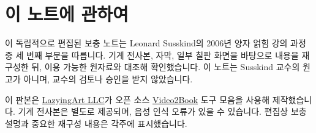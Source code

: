 \documentclass[11pt,oneside]{book}
\begin{document}
\frontmatter
\hypersetup{pageanchor=false}

\hypersetup{pageanchor=true}

\clearpage
\chapter{이 노트에 관하여}
이 독립적으로 편집된 보충 노트는 Leonard Susskind의 2006년 양자 얽힘 강의 과정 중 세 번째 부분을 따릅니다. 기계 전사본, 자막, 일부 칠판 화면을 바탕으로 내용을 재구성한 뒤, 이용 가능한 원자료와 대조해 확인했습니다. 이 노트는 Susskind 교수의 원고가 아니며, 교수의 검토나 승인을 받지 않았습니다.

이 판본은 \href{https://lazying.art}{LazyingArt LLC}가 오픈 소스 \href{https://github.com/lachlanchen/Video2Book}{Video2Book} 도구 모음을 사용해 제작했습니다. 기계 전사본은 별도로 제공되며, 음성 인식 오류가 있을 수 있습니다. 편집상 보충 설명과 중요한 재구성 내용은 각주에 표시했습니다.
\clearpage
\tableofcontents
\mainmatter








\end{document}
